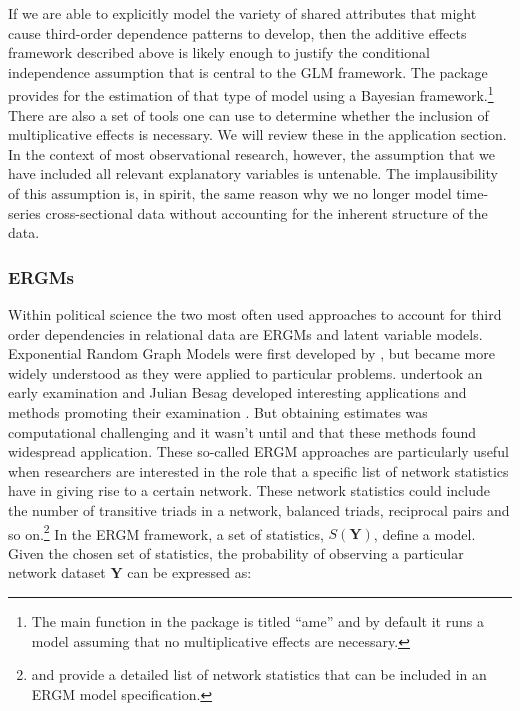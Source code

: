 If we are able to explicitly model the variety of shared attributes that might cause third-order dependence patterns to develop, then the additive effects framework described above is likely enough to justify the conditional independence assumption that is central to the GLM framework. The  package provides for the estimation of that type of model using a Bayesian framework.\footnote{The main function in the  package is titled ``ame'' and by default it runs a model assuming that no multiplicative effects are necessary.} There are also a set of tools one can use to determine whether the inclusion of multiplicative effects is necessary. We will review these in the application section. In the context of most observational research, however, the assumption that we have included all relevant explanatory variables is untenable. The implausibility of this assumption is, in spirit, the same reason why we no longer model time-series cross-sectional data without accounting for the inherent structure of the data.

\subsubsection{\textbf{ERGMs}}

Within political science the two most often used approaches to account for third order dependencies in relational data are ERGMs and latent variable models. Exponential Random Graph Models were first developed by \citet{erdos:renyi:1959}, but became more widely understood as they were applied to particular problems.  \citet{frank:1971} undertook an early examination and Julian Besag developed interesting applications and methods promoting their examination \citep{besag:1977b}. But obtaining estimates was computational challenging and it wasn't until \citet{frank:strauss:1986} and \citet{wasserman:pattison:1996} that these methods found widespread application. These so-called ERGM approaches are particularly useful when researchers are interested in the role that a specific list of network statistics have in giving rise to a certain network. These network statistics could include the number of transitive triads in a network, balanced triads, reciprocal pairs and so on.\footnote{\citet{morris:etal:2008} and \citet{snijders:etal:2006} provide a detailed list of network statistics that can be included in an ERGM model specification.} In the ERGM framework, a set of statistics, $S(\mathbf{Y})$, define a model. Given the chosen set of statistics, the probability of observing a particular network dataset $\mathbf{Y}$ can be expressed as:

